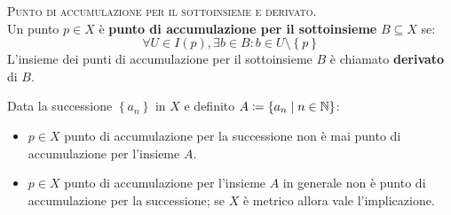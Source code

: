 \begin{define}\textsc{Punto di accumulazione per il sottoinsieme e derivato.}\\
	Un punto $p\in X$ è \textbf{punto di accumulazione per il sottoinsieme} $B\subseteq X$ se:
	\begin{equation}
		\forall U\in I\left(p\right), \exists b\in B \colon b\in U\setminus \left\{ p\right\}
	\end{equation}
L'insieme dei punti di accumulazione per il sottoinsieme $B$ è chiamato \textbf{derivato} di $B$.
\end{define}
\begin{exercise}
Data la successione $\left\{a_n\right\}$ in $X$ e definito $A\coloneqq \{a_n\mid n\in\mathbb{N}\}$:
\begin{itemize}
\item $p\in X$ punto di accumulazione per la successione non è mai punto di accumulazione per l'insieme $A$.
\item $p\in X$ punto di accumulazione per l'insieme $A$ in generale non è punto di accumulazione per la successione; se $X$ è metrico allora vale l'implicazione.
\end{itemize}
\vspace{-3mm}
\end{exercise}
